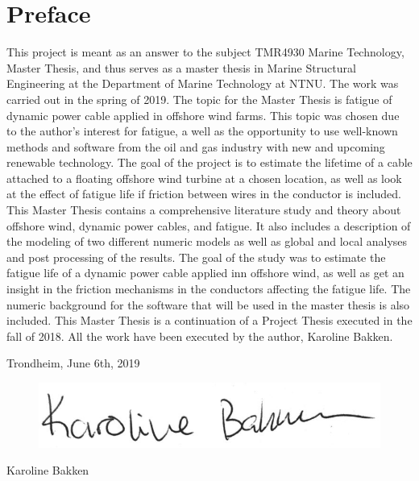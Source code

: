 \hypersetup{pageanchor=true}
%
\chapter*{Preface}
This project is meant as an answer to the subject TMR4930 Marine Technology, Master Thesis, and thus serves as a master thesis in Marine Structural Engineering at the Department of Marine Technology at NTNU. The work was carried out in the spring of 2019. \newline
\newline
The topic for the Master Thesis is fatigue of dynamic power cable applied in offshore wind farms. This topic was chosen due to the author's interest for fatigue, a well as the opportunity to use well-known methods and software from the oil and gas industry with new and upcoming renewable technology. The goal of the project is to estimate the lifetime of a cable attached to a floating offshore wind turbine at a chosen location, as well as look at the effect of fatigue life if friction between wires in the conductor is included. This Master Thesis contains a comprehensive literature study and theory about offshore wind, dynamic power cables, and fatigue. It also includes a description of the modeling of two different numeric models as well as global and local analyses and post processing of the results. The goal of the study was to estimate the fatigue life of a dynamic power cable applied inn offshore wind, as well as get an insight in the friction mechanisms in the conductors affecting the fatigue life. The numeric background for the software that will be used in the master thesis is also included. \newline
\newline
This Master Thesis is a continuation of a Project Thesis executed in the fall of 2018. All the work have been executed by the author, Karoline Bakken. 
\newline
\newline
\newline
\newline
\newline
\newline
\begin{center}
    Trondheim, June 6th, 2019
    \end{center}
\begin{figure}[H]
\centering
\includegraphics[scale=0.5]{figures/sign}
\end{figure}
\begin{center}
Karoline Bakken
\end{center}
